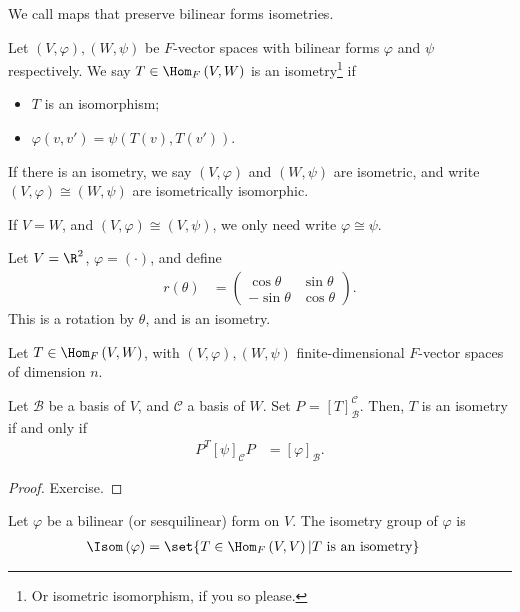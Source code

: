 \documentclass[10pt]{mypackage}
\begin{document}
  We call maps that preserve bilinear forms isometries.
  \begin{definition}
    Let $\left(V,\varphi\right),\left(W,\psi\right)$ be $F$-vector spaces with bilinear forms $\varphi$ and $\psi$ respectively. We say $T\in \Hom_{F}\left(V,W\right)$ is an isometry\footnote{Or isometric isomorphism, if you so please.} if
    \begin{itemize}
      \item $T$ is an isomorphism;
      \item $\varphi\left(v,v'\right) = \psi\left(T\left(v\right),T\left(v'\right)\right)$.
    \end{itemize}
    If there is an isometry, we say $\left(V,\varphi\right)$ and $\left(W,\psi\right)$ are isometric, and write $\left(V,\varphi\right)\cong \left(W,\psi\right)$ are isometrically isomorphic.\newline

    If $V = W$, and $\left(V,\varphi\right) \cong \left(V,\psi\right)$, we only need write $\varphi \cong \psi$.
  \end{definition}
  \begin{example}
    Let $V = \R^2$, $\varphi = \left(\cdot\right)$, and define
    \begin{align*}
      r\left(\theta\right) &= \begin{pmatrix}\cos\theta & \sin\theta \\ -\sin\theta & \cos\theta\end{pmatrix}.
    \end{align*}
    This is a rotation by $\theta$, and is an isometry.
  \end{example}
  \begin{lemma}
    Let $T\in \Hom_{F}\left(V,W\right)$, with $\left(V,\varphi\right),\left(W,\psi\right)$ finite-dimensional $F$-vector spaces of dimension $n$.\newline

    Let $\mathcal{B}$ be a basis of $V$, and $\mathcal{C}$ a basis of $W$. Set $P$ = $\left[T\right]_{\mathcal{B}}^{\mathcal{C}}$. Then, $T$ is an isometry if and only if
    \begin{align*}
      P^{T} \left[\psi\right]_{\mathcal{C}}P &= \left[\varphi\right]_{\mathcal{B}}.
    \end{align*}
  \end{lemma}
  \begin{proof}
    Exercise.
  \end{proof}
  \begin{definition}
    Let $\varphi$ be a bilinear (or sesquilinear) form on $V$. The isometry group of $\varphi$ is
    \begin{align*}
      \Isom\left(\varphi\right) &= \set{T\in \Hom_{F}\left(V,V\right) | T\text{ is an isometry}}
    \end{align*}
  \end{definition}
\end{document}
